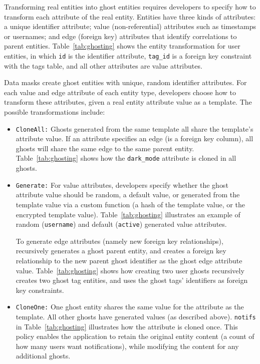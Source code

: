 Transforming real entities into ghost entities requires developers to specify how to transform each
attribute of the real entity.
%
Entities have three kinds of attributes: a unique identifier attribute; value
(non-referential) attributes such as timestamps or usernames; and edge (foreign key)
attributes that identify correlations to parent entities.
%
Table~\ref{tab:ghosting} shows the entity transformation for user entities, in which \texttt{id} is 
the identifier attribute, 
\texttt{tag\_id} is a foreign key constraint with the tags table, and all other attributes are value
attributes.

Data masks create ghost entities with unique, random identifier attributes.
For each value and edge attribute of each entity type, developers choose how to transform these
attributes, given a real entity attribute value as a template. 
The possible transformations include:
\begin{itemize}[nosep]
    \item \texttt{CloneAll:} Ghosts generated from the same template all share the template's
        attribute value. If an attribute specifies an edge (is a foreign key column), 
        all ghosts will share the same edge to the same parent entity.
        Table~\ref{tab:ghosting} shows how the \texttt{dark\_mode} attribute is cloned in all
        ghosts.

    \item \texttt{Generate:}
        For value attributes, developers specify whether the ghost attribute value should be random,
        a default value, or generated from the template value via a custom function (\eg a hash of
        the template value, or the encrypted template value). Table~\ref{tab:ghosting} illustrates
        an example of random (\texttt{username}) and default (\texttt{active}) generated value attributes.

        To generate edge attributes (namely new foreign key relationships), \sys recursively
        generates a ghost parent entity, and creates a foreign key relationship to the new parent
        ghost identifier as the ghost edge attribute value.  Table~\ref{tab:ghosting}
        shows how creating two user ghosts recursively creates two ghost tag entities, and uses
        the ghost tags' identifiers as foreign key constraints.

    \item \texttt{CloneOne:} One ghost entity shares the same value for the attribute as the
        template. All other ghosts have generated values (as described above).
        \texttt{notifs} in Table~\ref{tab:ghosting} illustrates how the attribute is cloned
        once. This policy enables the application to retain the original entity content (\eg a count
        of how many users want notifications), while modifying the content for any additional
        ghosts.
\end{itemize}

